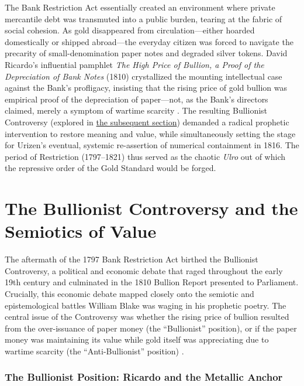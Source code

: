 \documentclass[
]{article}
\begin{document}
The Bank Restriction Act essentially created an environment where
private mercantile debt was transmuted into a public burden, tearing at
the fabric of social cohesion. As gold disappeared from
circulation---either hoarded domestically or shipped abroad---the
everyday citizen was forced to navigate the precarity of
small-denomination paper notes and degraded silver tokens. David
Ricardo's influential pamphlet \emph{The High Price of Bullion, a Proof
of the Depreciation of Bank Notes} (1810) crystallized the mounting
intellectual case against the Bank's profligacy, insisting that the
rising price of gold bullion was empirical proof of the depreciation of
paper---not, as the Bank's directors claimed, merely a symptom of
wartime scarcity \citep{ricardo1810high}. The resulting Bullionist
Controversy (explored in
\href{02d_bullionist_controversy.md\#the-bullionist-controversy-and-the-semiotics-of-value}{the
subsequent section}) demanded a radical prophetic intervention to
restore meaning and value, while simultaneously setting the stage for
Urizen's eventual, systemic re-assertion of numerical containment in
1816. The period of Restriction (1797--1821) thus served as the chaotic
\emph{Ulro} out of which the repressive order of the Gold Standard would
be forged.

\newpage

\section{The Bullionist Controversy and the Semiotics of
Value}\label{the-bullionist-controversy-and-the-semiotics-of-value}

The aftermath of the 1797 Bank Restriction Act birthed the Bullionist
Controversy, a political and economic debate that raged throughout the
early 19th century and culminated in the 1810 Bullion Report presented
to Parliament. Crucially, this economic debate mapped closely onto the
semiotic and epistemological battles William Blake was waging in his
prophetic poetry. The central issue of the Controversy was whether the
rising price of bullion resulted from the over-issuance of paper money
(the ``Bullionist'' position), or if the paper money was maintaining its
value while gold itself was appreciating due to wartime scarcity (the
``Anti-Bullionist'' position) \citep{fetter1965development}.

\subsubsection{The Bullionist Position: Ricardo and the Metallic
Anchor}\label{the-bullionist-position-ricardo-and-the-metallic-anchor}
\end{document}
